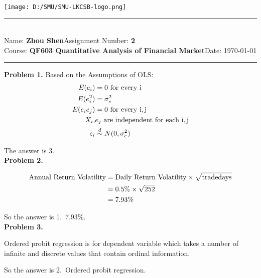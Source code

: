 \documentclass[12pt,a4paper]{article}
\newcommand{\student}{\textbf{Zhou Shen}}
\newcommand{\course}{\textbf{QF603 Quantitative Analysis of Financial Market}}
\newcommand{\assignment}{\textbf{2}}
\begin{document}
\thispagestyle{empty}
\begin{center}
	\texttt{[image: D:/SMU/SMU-LKCSB-logo.png]}
	\vspace{0.5cm}
\end{center}
\noindent
\rule{17cm}{0.2cm}\\[0.3cm]
Name: \student \hfill Assignment Number: \assignment\\[0.1cm]
Course: \course \hfill Date: \today\\
\rule{17cm}{0.05cm}
\vspace{1.0cm}

\textbf{Problem 1.}
Based on the Assumptions of OLS:
\[
\begin{aligned}
    E(e_{i}) &= 0\ \rm{for\ every}\ i \\
    E(e_{i}^2) &= \sigma_{e}^2  \\
    E(e_{i}e_{j}) &= 0\ \rm{for\ every}\ i,j \\
    X_{i},&e_{j}\ \rm{are\ independent\ for\ each}\ i,j \\
    e_{i}&\stackrel{d}{\sim}N(0,\sigma_{e}^2)
\end{aligned}
\]

The answer is 3.
\\

\textbf{Problem 2.}

\[
\begin{aligned}
\rm{Annual\ Return\ Volatility} &= \rm{Daily\ Return\ Volatility} \times \sqrt{\rm{trade days}}\\
                        &= 0.5 \% \times \sqrt{252}\\
                        &= 7.93 \%
\end{aligned}
\]

So the answer is 1.\ 7.93\%.
\\

\textbf{Problem 3.}

Ordered probit regression is for dependent variable which takes a number of infinite and discrete values that contain ordinal information.

So the answer is 2.\ Ordered probit regression.
\\
\end{document}
